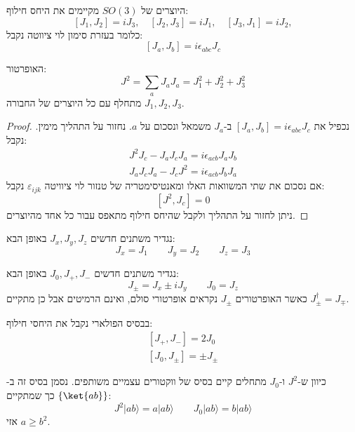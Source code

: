 \documentclass{tstextbook}
\begin{document}
\begin{corollary}
היוצרים של \(SO(3)\) מקיימים את היחס חילוף:
$$[J_{1},J_{2}]=i J_{3},\quad[J_{2},J_{3}]=i J_{1},\quad[J_{3},J_{1}]=i J_{2},$$
כלומר בעזרת סימון לוי ציווטה נקבל:
$$\left[J_a,J_{b}\right]=i\epsilon_{a b c}J_{c}$$

\end{corollary}
\begin{proposition}
האופרטור:
$$J^{2}=\sum_{a}J_{a}J_{a}=J_{1}^{2}+J_{2}^{2}+J_{3}^{2}$$
מתחלף עם כל היוצרים של החבורה \(J_{1},J_{2},J_{3}\).

\end{proposition}
\begin{proof}
נכפיל את \(\left[J_a,J_{b}\right]=i\epsilon_{a b c}J_{c}\) ב-\(J_{a}\) משמאל ונסכום על \(a\). נחזור על התהליך מימין. נקבל:
$$\begin{gather}{{J^{2}J_{c}-J_{a}J_{c}J_{a}}}{{=}}{{i\epsilon_{a c b}J_{a}J_{b}}}\\ {{J_{a}J_{c}J_{a}-J_{c}J^{2}}}{{=}}{{i\epsilon_{a c b}J_{b}J_{a}}} 
\end{gather}$$
אם נסכום את שתי המשוואות האלו ומאנטיסימטריה של טנזור לוי ציוויטה \(\varepsilon_{ijk}\) נקבל:
$$[J^{2},J_{c}]=0$$
ניתן לחזור על התהליך ולקבל שהיחס חילוף מתאפס עבור כל אחד מהיוצרים.

\end{proof}
\begin{definition}
נגדיר משתנים חדשים \(J_{x},J_{y},J_{z}\) באופן הבא:
$$J_{x}=J_{1} \qquad J_{y}=J_{2} \qquad  J_{z}=J_{3}$$

\end{definition}
\begin{definition}
נגדיר משתנים חדשים \(J_{0},J_{+},J_{-}\) באופן הבא:
$$J_{\pm}=J_{x}\pm i J_{y}\qquad J_{0}=J_{z}$$
כאשר האופרטורים \(J_{\pm}\) נקראים אופרטורי סולם, ואינם הרמיטים אבל כן מתקיים \(J_{\pm}^{\dagger}=J_{\mp}\).

\end{definition}
\begin{corollary}
בבסיס הפולארי נקבל את היחסי חילוף:
$$\begin{gather}{{\left[J_{+},J_{-}\right]}}{{=}}{{2J_{0}}}\\ {{\left[J_{0},J_{\pm}\right]}}{{=}}{{\pm J_{\pm}}}  
\end{gather}$$

\end{corollary}
\begin{proposition}
כיוון ש-\(J^{2}\) ו-\(J_{0}\) מתחלים קיים בסיס של ווקטורים עצמיים משותפים. נסמן בסיס זה ב-\(\left\{  \ket{ab}  \right\}\) כך שמתקיים:
$$J^{2}|a b\rangle=a|a b\rangle\qquad J_{0}|a b\rangle=b|a b\rangle$$
אזי \(a\geq b^{2}\).

\end{proposition}
\end{document}
